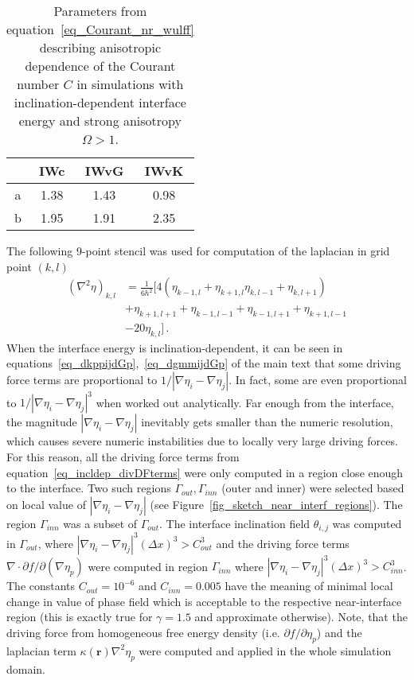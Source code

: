 	\begin{table}[]
		\centering
		\caption{Parameters from equation~\eqref{eq_Courant_nr_wulff} describing anisotropic dependence of the Courant number $C$ in simulations with inclination-dependent interface energy and strong anisotropy $\Omega>1$.}
		\label{tab_Courant_nr_wulff}
		\begin{tabular}{c|c|c|c}
			& IWc & IWvG & IWvK \\ \hline
			a & 1.38 & 1.43 & 0.98\\
			b& 1.95 & 1.91 & 2.35
		\end{tabular}
	\end{table}
	The following 9-point stencil was used for computation of the laplacian in grid point $(k,l)$
	\begin{equation}
		\begin{split}
			(\nabla^2\eta)_{k,l} &=  \frac{1}{6h^2}[4(\eta_{k-1,l}+ \eta_{k+1,l} \eta_{k,l-1}+ \eta_{k,l+1}) \\
			&+ \eta_{k+1,l+1} +\eta_{k-1,l-1}+\eta_{k-1,l+1}+\eta_{k+1,l-1} \\
			&-20\eta_{k,l}]  \,.
		\end{split}
	\end{equation}
	When the interface energy is inclination-dependent, it can be seen in equations~\eqref{eq_dkppijdGp},~\eqref{eq_dgmmijdGp} of the main text that some driving force terms are proportional to $1/|\nabla\eta_i-\nabla\eta_j|$. In fact, some are even proportional to $1/|\nabla\eta_i-\nabla\eta_j|^3$ when worked out analytically. Far enough from the interface, the magnitude $|\nabla\eta_i-\nabla\eta_j|$ inevitably gets smaller than the numeric resolution, which causes severe numeric instabilities due to locally very large driving forces. For this reason, all the driving force terms from equation~\eqref{eq_incldep_divDFterms} were only computed in a region close enough to the interface. Two such regions $\Gamma_{out},\Gamma_{inn}$ (outer and inner) were selected based on local value of $|\nabla\eta_i-\nabla\eta_j|$ (see Figure~\ref{fig_sketch_near_interf_regions}). The region $\Gamma_{inn}$ was a subset of $\Gamma_{out}$. The interface inclination field $\theta_{i,j}$ was computed in $\Gamma_{out}$, where $|\nabla\eta_i-\nabla\eta_j|^3(\Delta x)^3>C_{out}^3$ and the driving force terms $\nabla\cdot\partial f/\partial(\nabla\eta_p)$ were computed in region $\Gamma_{inn}$ where $|\nabla\eta_i-\nabla\eta_j|^3(\Delta x)^3>C_{inn}^3$. The constants $C_{out}=10^{-6}$ and $C_{inn}=0.005$ have the meaning of minimal local change in value of phase field which is acceptable to the respective near-interface region (this is exactly true for $\gamma=1.5$ and approximate otherwise). Note, that the driving force from homogeneous free energy density (i.e. $\partial f/\partial \eta_p$) and the laplacian term $\kappa(\bm{r})\nabla^2\eta_p$ were computed and applied in the whole simulation domain.
